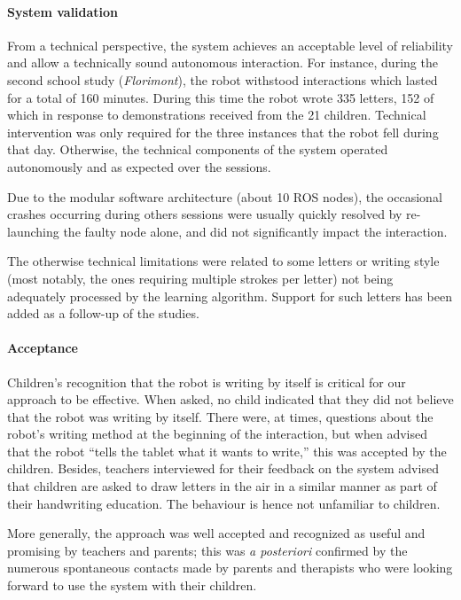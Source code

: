 \documentclass{article}
\begin{document}
\paragraph{System validation}

From a technical perspective, the system achieves an acceptable level of
reliability and allow a technically sound autonomous interaction. For instance,
during the second school study (\textit{Florimont}), the robot withstood
interactions which lasted for a total of 160 minutes.  During this time the
robot wrote 335 letters, 152 of which in response to demonstrations received
from the 21 children. Technical intervention was only required for the three
instances that the robot fell during that day.  Otherwise, the technical
components of the system operated autonomously and as expected over the
sessions.

Due to the modular software architecture (about 10 ROS nodes), the occasional
crashes occurring during others sessions were usually quickly resolved by
re-launching the faulty node alone, and did not significantly impact the
interaction.

The otherwise technical limitations were related to some letters or writing
style (most notably, the ones requiring multiple strokes per letter) not being
adequately processed by the learning algorithm. Support for such letters has
been added as a follow-up of the studies.

\paragraph{Acceptance}

Children's recognition that the robot is writing by itself is critical for our
approach to be effective. When asked, no child indicated that they did not
believe that the robot was writing by itself. There were, at times, questions
about the robot's writing method at the beginning of the interaction, but when
advised that the robot ``tells the tablet what it wants to write,'' this was
accepted by the children.  Besides, teachers interviewed for their feedback on
the system advised that children are asked to draw letters in the air in a
similar manner as part of their handwriting education. The behaviour is hence
not unfamiliar to children.

More generally, the approach was well accepted and recognized as useful and
promising by teachers and parents; this was \textit{a posteriori} confirmed by
the numerous spontaneous contacts made by parents and therapists who were
looking forward to use the system with their children.
\end{document}
